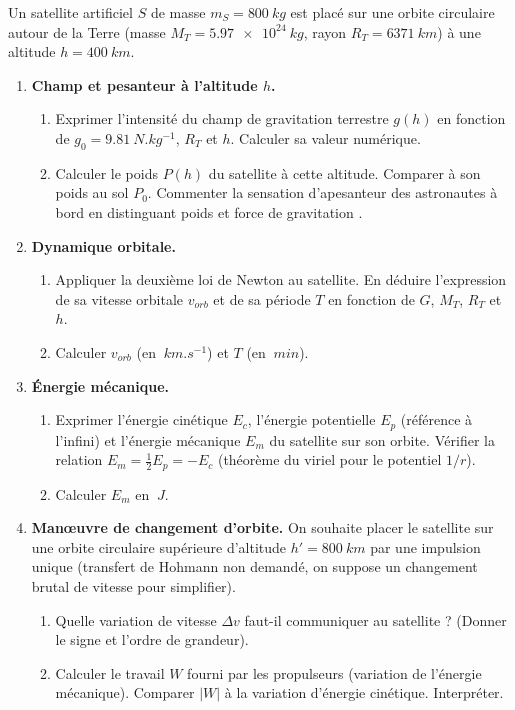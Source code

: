 \documentclass[11pt]{article}
\begin{document}
\begin{exercice}
Un satellite artificiel $S$ de masse $m_S = \SI{800}{kg}$ est placé sur une orbite circulaire autour de la Terre (masse $M_T = \SI{5,97e24}{kg}$, rayon $R_T = \SI{6371}{km}$) à une altitude $h = \SI{400}{km}$.
\begin{enumerate}
    \item \textbf{Champ et pesanteur à l'altitude $h$.}
    \begin{enumerate}
        \item Exprimer l'intensité du champ de gravitation terrestre $g(h)$ en fonction de $g_0 = \SI{9,81}{N.kg^{-1}}$, $R_T$ et $h$. Calculer sa valeur numérique.
        \item Calculer le poids $P(h)$ du satellite à cette altitude. Comparer à son poids au sol $P_0$. Commenter la sensation d'apesanteur des astronautes à bord en distinguant \og poids \fg{} et \og force de gravitation \fg.
    \end{enumerate}
    \item \textbf{Dynamique orbitale.}
    \begin{enumerate}
        \item Appliquer la deuxième loi de Newton au satellite. En déduire l'expression de sa vitesse orbitale $v_{orb}$ et de sa période $T$ en fonction de $G$, $M_T$, $R_T$ et $h$.
        \item Calculer $v_{orb}$ (en $\SI{}{km.s^{-1}}$) et $T$ (en $\SI{}{min}$).
    \end{enumerate}
    \item \textbf{Énergie mécanique.}
    \begin{enumerate}
        \item Exprimer l'énergie cinétique $E_c$, l'énergie potentielle $E_p$ (référence à l'infini) et l'énergie mécanique $E_m$ du satellite sur son orbite. Vérifier la relation $E_m = \frac{1}{2}E_p = -E_c$ (théorème du viriel pour le potentiel $1/r$).
        \item Calculer $E_m$ en $\SI{}{J}$.
    \end{enumerate}
    \item \textbf{Manœuvre de changement d'orbite.} On souhaite placer le satellite sur une orbite circulaire supérieure d'altitude $h' = \SI{800}{km}$ par une impulsion unique (transfert de Hohmann non demandé, on suppose un changement brutal de vitesse pour simplifier).
    \begin{enumerate}
        \item Quelle variation de vitesse $\Delta v$ faut-il communiquer au satellite ? (Donner le signe et l'ordre de grandeur).
        \item Calculer le travail $W$ fourni par les propulseurs (variation de l'énergie mécanique). Comparer $|W|$ à la variation d'énergie cinétique. Interpréter.
    \end{enumerate}
\end{enumerate}
\end{exercice}
\end{document}
